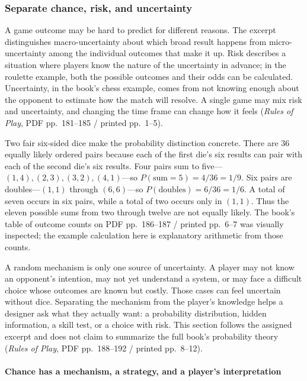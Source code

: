 \subsubsection{Separate chance, risk, and uncertainty}\label{05-engine-i-ch009-separate-chance-risk-and-uncertainty}

\hypertarget{05-engine-i-ch009-separate-chance-risk-and-uncertainty}{}

A game outcome may be hard to predict for different reasons. The excerpt distinguishes macro-uncertainty about which broad result happens from micro-uncertainty among the individual outcomes that make it up. Risk describes a situation where players know the nature of the uncertainty in advance; in the roulette example, both the possible outcomes and their odds can be calculated. Uncertainty, in the book's chess example, comes from not knowing enough about the opponent to estimate how the match will resolve. A single game may mix risk and uncertainty, and changing the time frame can change how it feels (\emph{Rules of Play}, PDF pp.~181--185 / printed pp.~1--5).

Two fair six-sided dice make the probability distinction concrete. There are 36 equally likely ordered pairs because each of the first die's six results can pair with each of the second die's six results. Four pairs sum to five---\((1,4),(2,3),(3,2),(4,1)\)---so \(P(\text{sum}=5)=4/36=1/9\). Six pairs are doubles---\((1,1)\) through \((6,6)\)---so \(P(\text{doubles})=6/36=1/6\). A total of seven occurs in six pairs, while a total of two occurs only in \((1,1)\). Thus the eleven possible sums from two through twelve are not equally likely. The book's table of outcome counts on PDF pp.~186--187 / printed pp.~6--7 was visually inspected; the example calculation here is explanatory arithmetic from those counts.

A random mechanism is only one source of uncertainty. A player may not know an opponent's intention, may not yet understand a system, or may face a difficult choice whose outcomes are known but costly. Those cases can feel uncertain without dice. Separating the mechanism from the player's knowledge helps a designer ask what they actually want: a probability distribution, hidden information, a skill test, or a choice with risk. This section follows the assigned excerpt and does not claim to summarize the full book's probability theory (\emph{Rules of Play}, PDF pp.~188--192 / printed pp.~8--12).

\paragraph{Chance has a mechanism, a strategy, and a player's interpretation}\label{05-engine-i-ch009-chance-has-a-mechanism-a-strategy-and-a-players-interpretation}

